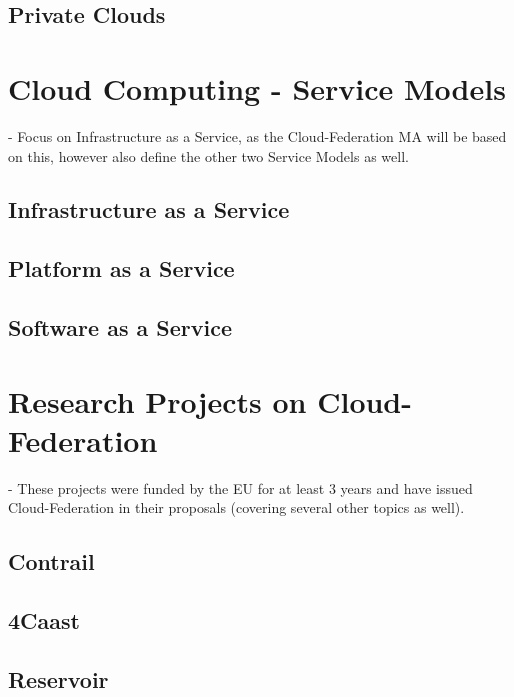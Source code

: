 \subsection{Private Clouds}



\section{Cloud Computing - Service Models}
- Focus on Infrastructure as a Service, as the Cloud-Federation MA will be based on this, however also define the other two Service Models as well.

\subsection{Infrastructure as a Service}

\subsection{Platform as a Service}

\subsection{Software as a Service}



\section{Research Projects on Cloud-Federation}
- These projects were funded by the EU for at least 3 years and have issued Cloud-Federation in their proposals (covering several other topics as well).

\subsection{Contrail}

\subsection{4Caast}

\subsection{Reservoir}